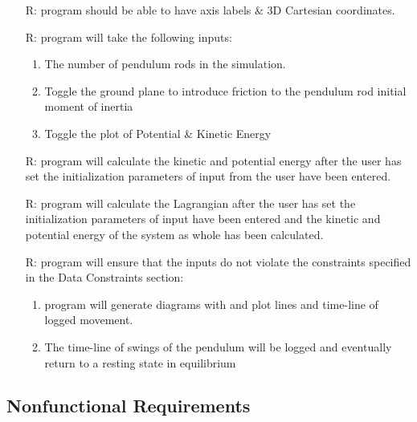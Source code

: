 \documentclass[12pt]{article}
\newcounter{reqnum} %
\begin{document}
\noindent \begin{itemize}

\item[R\refstepcounter{reqnum}\thereqnum \label{funinput}:] \progname 
program should be able to have axis labels \& 3D Cartesian coordinates. 

\item[R\refstepcounter{reqnum}\thereqnum \label{funinput}:] \progname program 
  will take the following inputs: 
  \begin{enumerate}
   \item The number of pendulum rods in the simulation. 
   \item Toggle the ground plane to introduce friction to the
   pendulum rod initial moment of inertia
   \item Toggle the plot of Potential \& Kinetic Energy
  \end{enumerate}
                    
\item[R\refstepcounter{reqnum}\thereqnum \label{funkinpot}:] \progname program 
will calculate the kinetic and potential energy after the user has set the 
initialization parameters of input from the user have been entered.

\item[R\refstepcounter{reqnum}\thereqnum \label{funlagham}:] \progname program 
will calculate the Lagrangian after the user has set the initialization 
parameters of input have been entered and the kinetic and potential energy of 
the system as whole has been calculated.

\item[R\refstepcounter{reqnum}\thereqnum \label{funplot}:] \progname program
will ensure that the inputs do not violate the constraints specified in the 
Data Constraints section:
    \begin{enumerate} \item \progname program will 
generate diagrams with and plot lines and time-line of logged movement. 
\item The time-line of swings of the pendulum will be logged and eventually
return to a resting state in equilibrium
\end{enumerate}

\end{itemize}
\newpage
\subsection{Nonfunctional Requirements}
\end{document}
